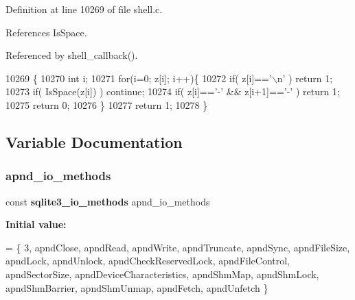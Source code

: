 Definition at line 10269 of file shell.\+c.



References Is\+Space.



Referenced by shell\+\_\+callback().


\begin{DoxyCode}
10269                                  \{
10270   \textcolor{keywordtype}{int} i;
10271   \textcolor{keywordflow}{for}(i=0; z[i]; i++)\{
10272     \textcolor{keywordflow}{if}( z[i]==\textcolor{charliteral}{'\(\backslash\)n'} ) \textcolor{keywordflow}{return} 1;
10273     \textcolor{keywordflow}{if}( IsSpace(z[i]) ) \textcolor{keywordflow}{continue};
10274     \textcolor{keywordflow}{if}( z[i]==\textcolor{charliteral}{'-'} && z[i+1]==\textcolor{charliteral}{'-'} ) \textcolor{keywordflow}{return} 1;
10275     \textcolor{keywordflow}{return} 0;
10276   \}
10277   \textcolor{keywordflow}{return} 1;
10278 \}
\end{DoxyCode}


\subsection{Variable Documentation}
\mbox{\label{shell_8c_aeb377708ef7f73fc709295f27a533706}} 
\subsubsection{apnd\+\_\+io\+\_\+methods}
{\footnotesize\ttfamily const \textbf{ sqlite3\+\_\+io\+\_\+methods} apnd\+\_\+io\+\_\+methods\hspace{0.3cm}{\ttfamily [static]}}

{\bfseries Initial value\+:}
\begin{DoxyCode}
= \{
  3,                              
  apndClose,                      
  apndRead,                       
  apndWrite,                      
  apndTruncate,                   
  apndSync,                       
  apndFileSize,                   
  apndLock,                       
  apndUnlock,                     
  apndCheckReservedLock,          
  apndFileControl,                
  apndSectorSize,                 
  apndDeviceCharacteristics,      
  apndShmMap,                     
  apndShmLock,                    
  apndShmBarrier,                 
  apndShmUnmap,                   
  apndFetch,                      
  apndUnfetch                     
\}
\end{DoxyCode}


